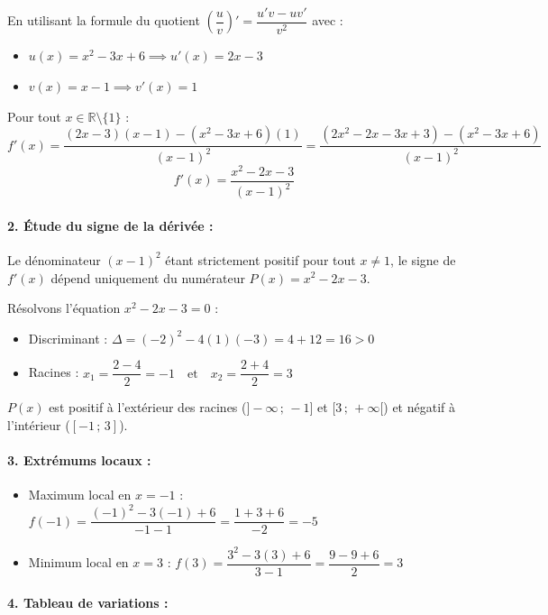 \documentclass[12pt,a4paper]{article}
\begin{document}
En utilisant la formule du quotient $\left(\dfrac{u}{v}\right)' = \dfrac{u'v - uv'}{v^2}$ avec :
\begin{itemize}
    \item $u(x) = x^2 - 3x + 6 \implies u'(x) = 2x - 3$
    \item $v(x) = x - 1 \implies v'(x) = 1$
\end{itemize}

Pour tout $x \in \mathbb{R} \setminus \{1\}$ :
\[
f'(x) = \frac{(2x - 3)(x - 1) - (x^2 - 3x + 6)(1)}{(x - 1)^2} = \frac{(2x^2 - 2x - 3x + 3) - (x^2 - 3x + 6)}{(x - 1)^2}
\]
\[
f'(x) = \frac{x^2 - 2x - 3}{(x - 1)^2}
\]

\paragraph{2. Étude du signe de la dérivée :}
Le dénominateur $(x - 1)^2$ étant strictement positif pour tout $x \neq 1$, le signe de $f'(x)$ dépend uniquement du numérateur $P(x) = x^2 - 2x - 3$.

Résolvons l'équation $x^2 - 2x - 3 = 0$ :
\begin{itemize}
    \item Discriminant : $\Delta = (-2)^2 - 4(1)(-3) = 4 + 12 = 16 > 0$
    \item Racines : $x_1 = \dfrac{2 - 4}{2} = -1 \quad \text{et} \quad x_2 = \dfrac{2 + 4}{2} = 3$
\end{itemize}

$P(x)$ est positif à l'extérieur des racines ($]- \infty \,;\, -1]$ et $[3 \,;\, +\infty[$) et négatif à l'intérieur ($[-1 \,;\, 3]$).

\paragraph{3. Extrémums locaux :}
\begin{itemize}
    \item Maximum local en $x = -1$ : $f(-1) = \dfrac{(-1)^2 - 3(-1) + 6}{-1 - 1} = \dfrac{1 + 3 + 6}{-2} = -5$
    \item Minimum local en $x = 3$ : $f(3) = \dfrac{3^2 - 3(3) + 6}{3 - 1} = \dfrac{9 - 9 + 6}{2} = 3$
\end{itemize}

\paragraph{4. Tableau de variations :}

\begin{center}
\end{center}
\end{document}
